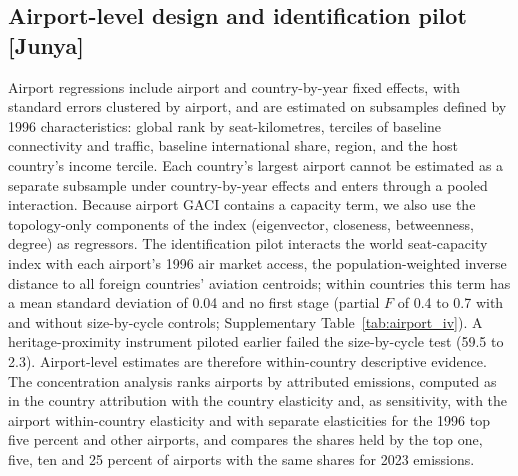 \documentclass[12pt]{extarticle}
\begin{document}
\subsection*{Airport-level design and identification pilot [Junya]}
Airport regressions include airport and country-by-year fixed effects, with
standard errors clustered by airport, and are estimated on subsamples
defined by 1996 characteristics: global rank by seat-kilometres, terciles
of baseline connectivity and traffic, baseline international share,
region, and the host country's income tercile. Each country's largest
airport cannot be estimated as a separate subsample under country-by-year
effects and enters through a pooled interaction. Because airport GACI
contains a capacity term, we also use the topology-only components of the
index (eigenvector, closeness, betweenness, degree) as regressors. The
identification pilot interacts the world seat-capacity index with each
airport's 1996 air market access, the population-weighted inverse distance
to all foreign countries' aviation centroids; within countries this term
has a mean standard deviation of 0.04 and no first stage (partial $F$ of
0.4 to 0.7 with and without size-by-cycle controls; Supplementary
Table~\ref{tab:airport_iv}). A heritage-proximity instrument piloted
earlier failed the size-by-cycle test (59.5 to 2.3). Airport-level
estimates are therefore within-country descriptive evidence. The
concentration analysis ranks airports by attributed emissions, computed as
in the country attribution with the country elasticity and, as
sensitivity, with the airport within-country elasticity and with separate
elasticities for the 1996 top five percent and other airports, and
compares the shares held by the top one, five, ten and 25 percent of
airports with the same shares for 2023 emissions.
\end{document}
